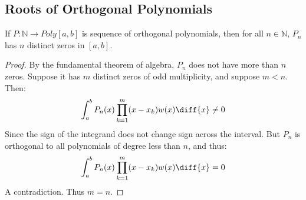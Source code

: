 \documentclass[crop=false,class=book,oneside]{standalone}
\begin{document}
        \subsection{Roots of Orthogonal Polynomials}
            \begin{theorem}
                If $P:\mathbb{N}\rightarrow{Poly}[a,b]$ is
                sequence of orthogonal polynomials, then for
                all $n\in\mathbb{N}$, $P_{n}$ has $n$ distinct
                zeros in $[a,b]$.
            \end{theorem}
            \begin{proof}
                By the fundamental theorem of algebra, $P_{n}$
                does not have more than $n$ zeros. Suppose it
                has $m$ distinct zeros of odd multiplicity,
                and suppose $m<n$. Then:
                \begin{equation}
                    \int_{a}^{b}P_{n}(x)\prod_{k=1}^{m}
                        (x-x_{k})w(x)\diff{x}\ne{0}
                \end{equation}
                Since the sign of the integrand does not
                change sign across the interval. But $P_{n}$
                is orthogonal to all polynomials of degree less
                than $n$, and thus:
                \begin{equation}
                    \int_{a}^{b}P_{n}(x)\prod_{k=1}^{m}
                        (x-x_{k})w(x)\diff{x}=0
                \end{equation}
                A contradiction. Thus $m=n$.
            \end{proof}
\end{document}
